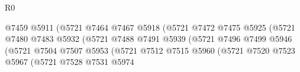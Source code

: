 \begin{lexlean}{R0}
\begin{coremodule}
                                                      @7459
                                                      @5911
                                                      (@5721
                                                        @7464
                                                        @7467
                                                        @5918
                                                        (@5721
                                                          @7472
                                                          @7475
                                                          @5925
                                                          (@5721
                                                            @7480
                                                            @7483
                                                            @5932
                                                            (@5721
                                                              @7488
                                                              @7491
                                                              @5939
                                                              (@5721
                                                                @7496
                                                                @7499
                                                                @5946
                                                                (@5721
                                                                  @7504
                                                                  @7507
                                                                  @5953
                                                                  (@5721
                                                                    @7512
                                                                    @7515
                                                                    @5960
                                                                    (@5721
                                                                      @7520
                                                                      @7523
                                                                      @5967
                                                                      (@5721
                                                                        @7528
                                                                        @7531
                                                                        @5974

\end{coremodule}
\end{lexlean}
